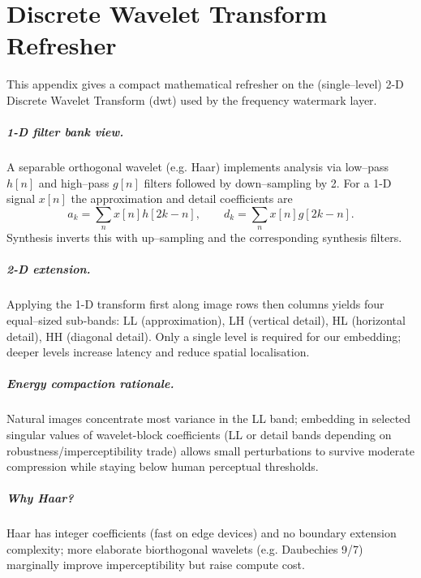 \chapter{Discrete Wavelet Transform Refresher}\label{app:dwt}

This appendix gives a compact mathematical refresher on the (single–level) 2-D
Discrete Wavelet Transform (\gls{dwt}) used by the frequency watermark layer.

\paragraph{1-D filter bank view.} A separable orthogonal wavelet (e.g. Haar)
implements analysis via low–pass $h[n]$ and high–pass $g[n]$ filters followed by
down–sampling by 2.
For a 1-D signal $x[n]$ the approximation and detail
coefficients are
\[
  a_k = \sum_n x[n] h[2k-n],\qquad d_k = \sum_n x[n] g[2k-n].
\]
Synthesis inverts this with up–sampling and the corresponding synthesis filters.

\paragraph{2-D extension.} Applying the 1-D transform first along image rows
then columns yields four equal–sized sub-bands: LL (approximation), LH (vertical
detail), HL (horizontal detail), HH (diagonal detail).
Only a single level is
required for our embedding; deeper levels increase latency and reduce spatial
localisation.

\paragraph{Energy compaction rationale.} Natural images concentrate most
variance in the LL band; embedding in selected singular values of wavelet-block
coefficients (LL or detail bands depending on robustness/imperceptibility
trade) allows small perturbations to survive moderate compression while staying
below human perceptual thresholds.

\paragraph{Why Haar?} Haar has integer coefficients (fast on edge devices) and
no boundary extension complexity; more elaborate biorthogonal wavelets (e.g.
Daubechies 9/7) marginally improve imperceptibility but raise compute cost.

